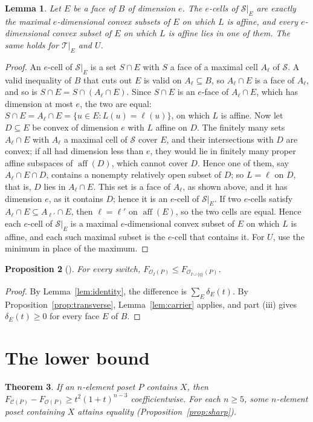 \documentclass[11pt]{article}
\newtheorem{theorem}{Theorem}[section]
\newtheorem{lemma}[theorem]{Lemma}
\newtheorem{proposition}[theorem]{Proposition}
\theoremstyle{definition}
\theoremstyle{remark}
\newcommand{\OO}{\mathcal O}
\newcommand{\CC}{\mathcal C}
\newcommand{\SSS}{\mathcal S}
\newcommand{\TT}{\mathcal T}
\newcommand{\aff}{\operatorname{aff}}
\begin{document}
\begin{lemma}\label{lem:restrict}
Let $E$ be a face of $B$ of dimension $e$. The $e$-cells of $\SSS|_E$
are exactly the maximal $e$-dimensional convex subsets of $E$ on which
$L$ is affine, and every $e$-dimensional convex subset of $E$ on which
$L$ is affine lies in one of them. The same holds for $\TT|_E$ and $U$.
\end{lemma}
\begin{proof}
An $e$-cell of $\SSS|_E$ is a set $S\cap E$ with $S$ a face of a maximal
cell $A_\ell$ of $\SSS$. A valid inequality of $B$ that cuts out $E$ is valid on
$A_\ell\subseteq B$, so $A_\ell\cap E$ is a face of $A_\ell$, and so is
$S\cap E=S\cap(A_\ell\cap E)$. Since $S\cap E$ is an $e$-face of $A_\ell\cap E$,
which has dimension at most $e$, the two are equal: $S\cap E=A_\ell\cap E=\{u\in
E:L(u)=\ell(u)\}$, on which $L$ is affine. Now let $D\subseteq E$ be convex
of dimension $e$ with $L$ affine on $D$. The finitely many sets
$A_\ell\cap E$ with $A_\ell$ a maximal cell of $\SSS$ cover $E$, and their intersections with $D$ are
convex; if all had dimension less than $e$, they would lie in finitely many proper affine subspaces of
$\aff(D)$, which cannot cover $D$. Hence one of them, say $A_\ell\cap E\cap D$, contains a nonempty relatively open subset of $D$;
so $L=\ell$ on $D$,
that is, $D$ lies in $A_\ell\cap E$. This set is a face of $A_\ell$, as shown above, and it has dimension $e$, as it contains $D$; hence it is an $e$-cell of $\SSS|_E$. If two $e$-cells satisfy $A_\ell\cap E\subseteq A_{\ell'}\cap E$, then $\ell=\ell'$ on $\aff(E)$, so the two cells are equal. Hence each $e$-cell of $\SSS|_E$ is a maximal $e$-dimensional convex
subset of $E$ on which $L$ is affine, and each such maximal subset is the $e$-cell that contains it.
For $U$, use the minimum in place of the maximum.
\end{proof}

\begin{proposition}[{\cite[Proposition~6.1]{Fourier}}]\label{prop:mono}
For every switch, $F_{\OO_I(P)}\leq F_{\OO_{I\cup\{q\}}(P)}$.
\end{proposition}
\begin{proof}
By Lemma~\ref{lem:identity}, the difference is $\sum_E\delta_E(t)$. By
Proposition~\ref{prop:transverse}, Lemma~\ref{lem:carrier} applies, and part (iii) gives
$\delta_E(t)\geq0$ for every face $E$ of $B$.
\end{proof}

\section{The lower bound}\label{sec:gap}
\begin{theorem}\label{thm:main}
If an $n$-element poset $P$ contains $X$, then
$F_{\CC(P)}-F_{\OO(P)}\geq t^2(1+t)^{n-3}$ coefficientwise. For each
$n\geq5$, some $n$-element poset containing $X$ attains equality
(Proposition~\ref{prop:sharp}).
\end{theorem}
\end{document}

